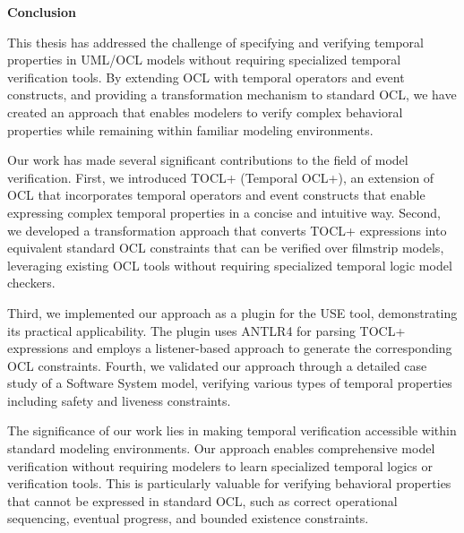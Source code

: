 \begin{center}
  \textbf{\fontsize{20}{24}\selectfont Conclusion}
\end{center}


This thesis has addressed the challenge of specifying and verifying temporal 
properties in UML/OCL models without requiring specialized temporal verification 
tools. By extending OCL with temporal operators and event constructs, and providing 
a transformation mechanism to standard OCL, we have created an approach that enables 
modelers to verify complex behavioral properties while remaining within familiar 
modeling environments.

Our work has made several significant contributions to the field of model verification.
First, we introduced TOCL+ (Temporal OCL+), an extension of OCL that incorporates 
temporal operators and event constructs that enable expressing complex temporal 
properties in a concise and intuitive way. Second, we developed a transformation 
approach that converts TOCL+ expressions into equivalent standard OCL constraints 
that can be verified over filmstrip models, leveraging existing OCL tools without 
requiring specialized temporal logic model checkers.

Third, we implemented our approach as a plugin for the USE tool, demonstrating its 
practical applicability. The plugin uses ANTLR4 for parsing TOCL+ expressions and 
employs a listener-based approach to generate the corresponding OCL constraints.
Fourth, we validated our approach through a detailed case study of a Software System 
model, verifying various types of temporal properties including safety and liveness 
constraints.

The significance of our work lies in making temporal verification accessible within 
standard modeling environments. Our approach enables comprehensive model verification 
without requiring modelers to learn specialized temporal logics or verification tools.
This is particularly valuable for verifying behavioral properties that cannot be 
expressed in standard OCL, such as correct operational sequencing, eventual progress, 
and bounded existence constraints.

